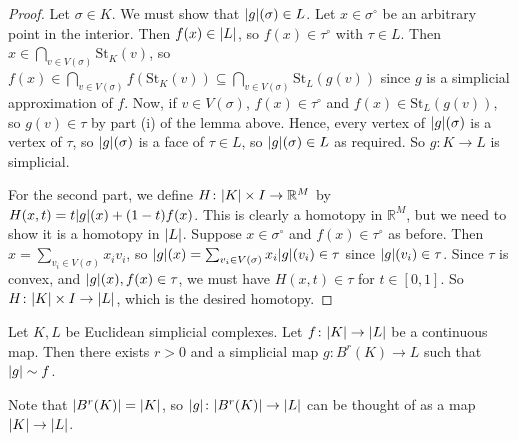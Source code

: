\begin{proof}
	Let \( \sigma \in K \).
	We must show that \( \abs{g}(\sigma) \in L \).
	Let \( x \in \sigma^\circ \) be an arbitrary point in the interior.
	Then \( f(x) \in \abs{L} \), so \( f(x) \in \tau^\circ \) with \( \tau \in L \).
	Then \( x \in \bigcap_{v \in V(\sigma)} \mathrm{St}_K(v) \), so \( f(x) \in \bigcap_{v \in V(\sigma)} f(\mathrm{St}_K(v)) \subseteq \bigcap_{v \in V(\sigma)} \mathrm{St}_L(g(v)) \) since \( g \) is a simplicial approximation of \( f \).
	Now, if \( v \in V(\sigma) \), \( f(x) \in \tau^\circ \) and \( f(x) \in \mathrm{St}_L(g(v)) \), so \( g(v) \in \tau \) by part (i) of the lemma above.
	Hence, every vertex of \( \abs{g}(\sigma) \) is a vertex of \( \tau \), so \( \abs{g}(\sigma) \) is a face of \( \tau \in L \), so \( \abs{g}(\sigma) \in L \) as required.
	So \( g \colon K \to L \) is simplicial.

	For the second part, we define \( H \colon \abs{K} \times I \to \mathbb R^M \) by \( H(x,t) = t \abs{g}(x) + (1-t)f(x) \).
	This is clearly a homotopy in \( \mathbb R^M \), but we need to show it is a homotopy in \( \abs{L} \).
	Suppose \( x \in \sigma^\circ \) and \( f(x) \in \tau^\circ \) as before.
	Then \( x = \sum_{v_i \in V(\sigma)} x_i v_i \), so \( \abs{g}(x) = \sum_{v_i \in V(\sigma)} x_i \abs{g}(v_i) \in \tau \) since \( \abs{g}(v_i) \in \tau \).
	Since \( \tau \) is convex, and \( \abs{g}(x), f(x) \in \tau \), we must have \( H(x,t) \in \tau \) for \( t \in [0,1] \).
	So \( H \colon \abs{K} \times I \to \abs{L} \), which is the desired homotopy.
\end{proof}
\begin{theorem}
	Let \( K, L \) be Euclidean simplicial complexes.
	Let \( f \colon \abs{K} \to \abs{L} \) be a continuous map.
	Then there exists \( r > 0 \) and a simplicial map \( g \colon B^r(K) \to L \) such that \( \abs{g} \sim f \).
\end{theorem}
Note that \( \abs{B^r(K)} = \abs{K} \), so \( \abs{g} \colon \abs{B^r(K)} \to \abs{L} \) can be thought of as a map \( \abs{K} \to \abs{L} \).
